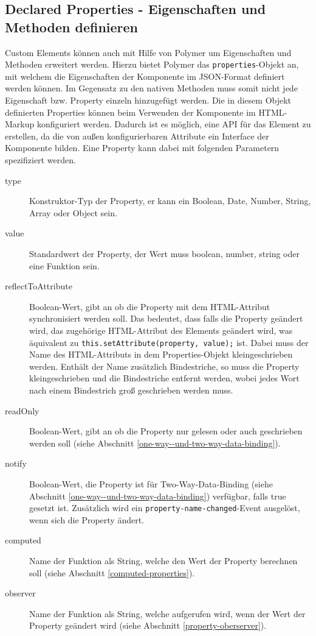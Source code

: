 \subsection{Declared Properties - Eigenschaften und Methoden definieren}\label{declared-properties---eigenschaften-und-methoden-definieren}

Custom Elements können auch mit Hilfe von Polymer um Eigenschaften und Methoden erweitert werden. Hierzu bietet Polymer das \texttt{properties}-Objekt an, mit welchem die Eigenschaften der Komponente im JSON-Format definiert werden können. Im Gegensatz zu den nativen Methoden muss somit nicht jede Eigenschaft bzw. Property einzeln hinzugefügt werden. Die in diesem Objekt definierten Properties können beim Verwenden der Komponente im \ac{HTML}-Markup konfiguriert werden. Dadurch ist es möglich, eine \ac{API} für das Element zu erstellen, da die von außen konfigurierbaren Attribute ein Interface der Komponente bilden. Eine Property kann dabei mit folgenden Parametern spezifiziert werden.

\begin{description}
  \item[type] Konstruktor-Typ der Property, er kann ein Boolean, Date, Number, String, Array oder Object sein.
  \item[value] Standardwert der Property, der Wert muss boolean, number, string oder eine Funktion sein.
  \item[reflectToAttribute] Boolean-Wert, gibt an ob die Property mit dem \ac{HTML}-Attribut synchronisiert werden soll. Das bedeutet, dass falls die Property geändert wird, das zugehörige \ac{HTML}-Attribut des Elements geändert wird, was äquivalent zu \texttt{this.setAttribute(property,\ value);} ist. Dabei muss der Name des \ac{HTML}-Attributs in dem Properties-Objekt kleingeschrieben werden. Enthält der Name zusätzlich Bindestriche, so muss die Property kleingeschrieben und die Bindestriche entfernt werden, wobei jedes Wort nach einem Bindestrich groß geschrieben werden muss.
  \item[readOnly] Boolean-Wert, gibt an ob die Property nur gelesen oder auch geschrieben werden soll (siehe Abschnitt \ref{one-way--und-two-way-data-binding}).
  \item[notify] Boolean-Wert, die Property ist für Two-Way-Data-Binding (siehe Abschnitt \ref{one-way--und-two-way-data-binding}) verfügbar, falls true gesetzt ist. Zusätzlich wird ein \texttt{property-name-changed}-Event ausgelöst, wenn sich die Property ändert.
  \item[computed] Name der Funktion als String, welche den Wert der Property berechnen soll (siehe Abschnitt \ref{computed-properties}).
  \item[observer] Name der Funktion als String, welche aufgerufen wird, wenn der Wert der Property geändert wird (siehe Abschnitt \ref{property-oberserver}).
\end{description}

